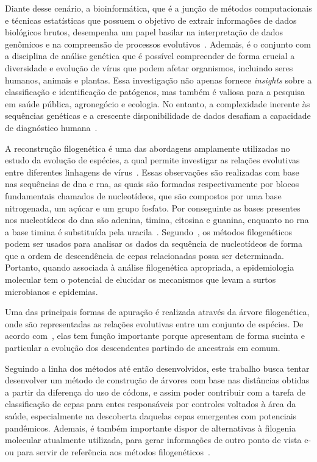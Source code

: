Diante desse cenário, a bioinformática, que é a junção de métodos computacionais e técnicas estatísticas que possuem o objetivo de extrair informações de dados biológicos brutos, desempenha um papel basilar na interpretação de dados genômicos e na compreensão de processos evolutivos~\cite{herramientas_gonzales_2016}. Ademais, é o conjunto com a disciplina de análise genética que é possível compreender de forma crucial a diversidade e evolução de vírus que podem afetar organismos, incluindo seres humanos, animais e plantas. Essa investigação não apenas fornece \textit{insights} sobre a classificação e identificação de patógenos, mas também é valiosa para a pesquisa em saúde pública, agronegócio e ecologia. No entanto, a complexidade inerente às sequências genéticas e a crescente disponibilidade de dados desafiam a capacidade de diagnóstico humana~\cite{virology_edward_2007, diversidade_flores_2000}.

A reconstrução filogenética é uma das abordagens amplamente utilizadas no estudo da evolução de espécies, a qual permite investigar as relações evolutivas entre diferentes linhagens de vírus~\cite{sistematica_santos_2012, consideracoes_ribas_2006,dinossauros_santos_2008}. Essas observações são realizadas com base nas sequências de \gls{dna} e \gls{rna}, as quais são formadas respectivamente por blocos fundamentais chamados de nucleotídeos, que são compostos por uma base nitrogenada, um açúcar e um grupo fosfato. Por conseguinte as bases presentes nos nucleotídeos do \gls{dna} são \gls{adenina}, \gls{timina}, \gls{citosina} e \gls{guanina}, enquanto no \gls{rna} a base \gls{timina} é substituída pela \gls{uracila}~\cite{alberts_molecular_2002,molecular_bernard_2022,genetica_peter_2017}.
Segundo~, os métodos filogenéticos podem ser usados para analisar os dados da sequência de nucleotídeos de forma que a ordem de descendência de cepas relacionadas possa ser determinada. Portanto, quando associada à análise filogenética apropriada, a epidemiologia molecular tem o potencial de elucidar os mecanismos que levam a surtos microbianos e epidemias.

Uma das principais formas de apuração é realizada através da árvore filogenética, onde são representadas as relações evolutivas entre um conjunto de espécies. De acordo com~, elas tem função importante porque apresentam de forma sucinta e particular a evolução dos descendentes partindo de ancestrais em comum.

Seguindo a linha dos métodos até então desenvolvidos, este trabalho busca tentar desenvolver um método de construção de árvores com base nas distâncias obtidas a partir da diferença do uso de códons, e assim poder contribuir com a tarefa de classificação de cepas para entes responsáveis por controles voltados à área da saúde, especialmente na descoberta daquelas cepas emergentes com potenciais pandêmicos. Ademais, é também importante dispor de alternativas à filogenia molecular atualmente utilizada, para gerar informações de outro ponto de vista e-ou para servir de referência aos métodos filogenéticos~\cite{virology_flint_2015}.

